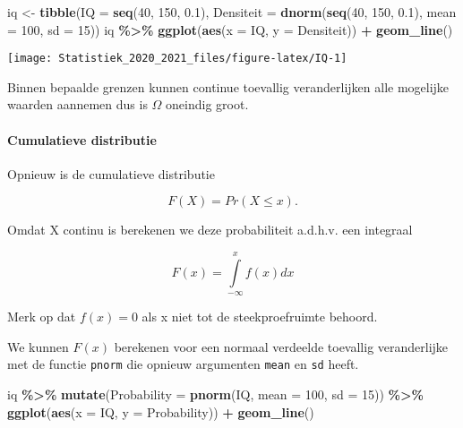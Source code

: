 \documentclass[
  12pt,dutch,coursenotes]{book}
\newenvironment{Shaded}{\begin{snugshade}}{\end{snugshade}}
\newcommand{\DataTypeTok}[1]{\textcolor[rgb]{0.13,0.29,0.53}{#1}}
\newcommand{\DecValTok}[1]{\textcolor[rgb]{0.00,0.00,0.81}{#1}}
\newcommand{\FloatTok}[1]{\textcolor[rgb]{0.00,0.00,0.81}{#1}}
\newcommand{\KeywordTok}[1]{\textcolor[rgb]{0.13,0.29,0.53}{\textbf{#1}}}
\newcommand{\NormalTok}[1]{#1}
\newcommand{\OperatorTok}[1]{\textcolor[rgb]{0.81,0.36,0.00}{\textbf{#1}}}
\newcommand{\StringTok}[1]{\textcolor[rgb]{0.31,0.60,0.02}{#1}}
\theoremstyle{definition}
\theoremstyle{definition}
\theoremstyle{definition}
\theoremstyle{remark}
\begin{document}
\begin{Shaded}
\begin{Highlighting}[]
\NormalTok{iq \textless{}{-}}\StringTok{ }\KeywordTok{tibble}\NormalTok{(}\DataTypeTok{IQ =} \KeywordTok{seq}\NormalTok{(}\DecValTok{40}\NormalTok{, }\DecValTok{150}\NormalTok{, }\FloatTok{0.1}\NormalTok{), }\DataTypeTok{Densiteit =} \KeywordTok{dnorm}\NormalTok{(}\KeywordTok{seq}\NormalTok{(}\DecValTok{40}\NormalTok{, }
    \DecValTok{150}\NormalTok{, }\FloatTok{0.1}\NormalTok{), }\DataTypeTok{mean =} \DecValTok{100}\NormalTok{, }\DataTypeTok{sd =} \DecValTok{15}\NormalTok{))}
\NormalTok{iq }\OperatorTok{\%\textgreater{}\%}\StringTok{ }\KeywordTok{ggplot}\NormalTok{(}\KeywordTok{aes}\NormalTok{(}\DataTypeTok{x =}\NormalTok{ IQ, }\DataTypeTok{y =}\NormalTok{ Densiteit)) }\OperatorTok{+}\StringTok{ }\KeywordTok{geom\_line}\NormalTok{()}
\end{Highlighting}
\end{Shaded}

\begin{center}\texttt{[image: Statistiek\_2020\_2021\_files/figure-latex/IQ-1]} \end{center}

Binnen bepaalde grenzen kunnen continue toevallig veranderlijken alle mogelijke waarden aannemen dus is \(\Omega\) oneindig groot.

\hypertarget{cumulatieve-distributie}{%
\paragraph{Cumulatieve distributie}\label{cumulatieve-distributie}}

Opnieuw is de cumulatieve distributie

\[F(X)=Pr(X\leq x).\]

Omdat X continu is berekenen we deze probabiliteit a.d.h.v. een integraal

\[F(x)=\int \limits_{-\infty}^x f(x) dx\]

Merk op dat \(f(x)=0\) als x niet tot de steekproefruimte behoord.

We kunnen \(F(x)\) berekenen voor een normaal verdeelde toevallig veranderlijke met de functie \texttt{pnorm} die opnieuw argumenten \texttt{mean} en \texttt{sd} heeft.

\begin{Shaded}
\begin{Highlighting}[]
\NormalTok{iq }\OperatorTok{\%\textgreater{}\%}\StringTok{ }\KeywordTok{mutate}\NormalTok{(}\DataTypeTok{Probability =} \KeywordTok{pnorm}\NormalTok{(IQ, }\DataTypeTok{mean =} \DecValTok{100}\NormalTok{, }\DataTypeTok{sd =} \DecValTok{15}\NormalTok{)) }\OperatorTok{\%\textgreater{}\%}\StringTok{ }
\StringTok{    }\KeywordTok{ggplot}\NormalTok{(}\KeywordTok{aes}\NormalTok{(}\DataTypeTok{x =}\NormalTok{ IQ, }\DataTypeTok{y =}\NormalTok{ Probability)) }\OperatorTok{+}\StringTok{ }\KeywordTok{geom\_line}\NormalTok{()}
\end{Highlighting}
\end{Shaded}
\end{document}
